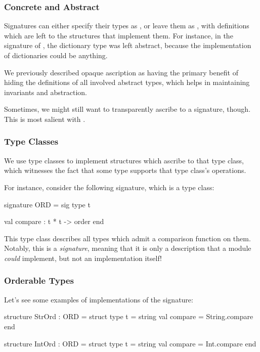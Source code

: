 \documentclass[aspectratio=169]{beamer}
\begin{document}
\begin{frame}[fragile]
  \frametitle{Concrete and Abstract}

  Signatures can either specify their types as , or leave
  them as , with definitions which are left to the
  structures that implement them. For instance, in the signature of 
  , the dictionary type  was left abstract,
  because the implementation of dictionaries could be anything.

  We previously described opaque ascription as having the primary benefit of 
  hiding the definitions of all involved abstract types, which helps in
  maintaining invariants and abstraction. 
  
  Sometimes, we might still want to transparently ascribe to a signature, though.
  This is most salient with .
\end{frame}

\begin{frame}[fragile]
  \frametitle{Type Classes}

  
  We use type classes to implement structures which ascribe to that type class,
  which witnesses the fact that some type supports that type class's operations.

  For instance, consider the following signature, which is a type class:
  \begin{codeblock}
    signature ORD = 
      sig
        type t 

        val compare : t * t -> order
      end
  \end{codeblock}

  This type class describes all types which admit a comparison function on them.
  Notably, this is a \textit{signature}, meaning that it is only a description
  that a module \textit{could} implement, but not an implementation itself!
\end{frame}

\begin{frame}[fragile]
  \frametitle{Orderable Types}

  Let's see some examples of implementations of the  signature:

  \begin{codeblock}
    structure StrOrd : ORD =
      struct
        type t = string
        val compare = String.compare
      end 

    structure IntOrd : ORD =
      struct
        type t = string
        val compare = Int.compare 
      end
  \end{codeblock}
\end{frame}
\end{document}
